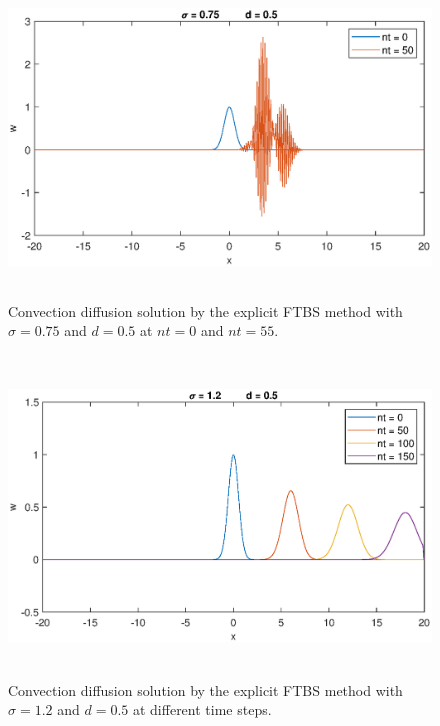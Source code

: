\documentclass[letterpaper,12pt]{article}
\begin{document}
\newpage
\begin{figure}[!ht] 
	\centering 
	\includegraphics[max height=8.5cm]{graphs/FTBS/ConvectionDiffusion/sigma075d05.eps}
	\caption{Convection diffusion solution by the explicit FTBS method with $\sigma= 0.75$ and $d=0.5$ at $nt=0$ and $nt=55$.}
	 \label{fig:FTBSsigma075d05}
\end{figure}
\begin{figure}[!ht] 
	\centering 
	\includegraphics[max height=8.5cm]{graphs/FTBS/ConvectionDiffusion/sigma12d05.eps}
	\caption{Convection diffusion solution by the explicit FTBS method with $\sigma= 1.2$ and $d=0.5$ at different time steps.}
	 \label{fig:FTBSsigma12d05}
\end{figure}
\newpage
\end{document}
